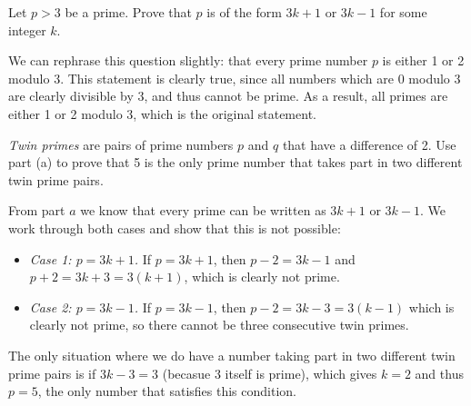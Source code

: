 \documentclass[11pt]{article}
\begin{document}
\begin{Parts}

\Part
Let $p > 3$ be a prime. Prove that $p$ is of the form $3k + 1$ or $3k-1$ for some integer $k$.

\begin{solution} 
    We can rephrase this question slightly: that every prime number $p$ is either 1 or 2 modulo 3. This statement is clearly true, since all numbers which are $0$ modulo 3 are clearly divisible by 3, and thus cannot be prime. As a result, all primes are either 1 or 2 modulo 3, which is the original statement.
\end{solution} 

\Part
\textit{Twin primes} are pairs of prime numbers $p$ and $q$ that have a difference of 2. Use part (a) to prove that 5 is the only prime number that takes part in two different twin prime pairs.

\begin{solution}
   From part $a$ we know that every prime can be written as $3k + 1$ or $3k - 1$. We work through both cases and show that this is not possible:

   \begin{itemize}
        \item \textit{Case 1: $p = 3k + 1$.} If $p = 3k + 1$, then $p - 2 = 3k - 1$ and $p + 2 = 3k+3 = 3(k+1)$, which is clearly not prime.
        \item \textit{Case 2: $p = 3k-1$.} If $p = 3k-1$, then $p - 2 = 3k - 3 = 3(k-1)$ which is clearly not prime, so there cannot be three consecutive twin primes.
   \end{itemize}

   The only situation where we do have a number taking part in two different twin prime pairs is if $3k - 3 = 3$ (becasue 3 itself is prime), which gives $k = 2$ and thus $p = 5$, the only number that satisfies this condition.
\end{solution}

\end{Parts}
\end{document}
